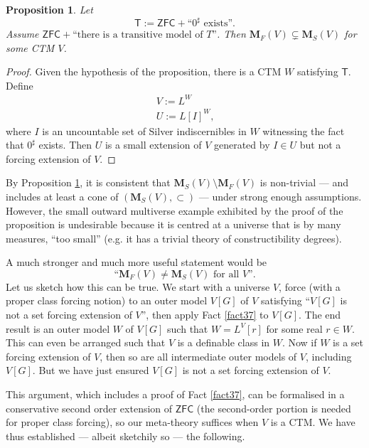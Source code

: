 \documentclass[12pt, twoside]{memoir}
\numberwithin{equation}{section}
\newtheorem{prop}[thm]{Proposition}
\theoremstyle{definition}
\theoremstyle{remark}
\theoremstyle{definition}
\theoremstyle{definition}
\theoremstyle{definition}
\theoremstyle{remark}
\begin{document}
\begin{prop}\label{prop318}
Let 
\begin{equation*}
    \mathsf{T} := \mathsf{ZFC} + \text{``}0^{\sharp}\text{ exists''.}
\end{equation*} 
Assume $\mathsf{ZFC} + \text{``there is a transitive model of } T \text{''}$. Then $\mathbf{M}_F(V) \subsetneq \mathbf{M}_S(V)$ for some CTM $V$.
\end{prop}

\begin{proof}
Given the hypothesis of the proposition, there is a CTM $W$ satisfying $\mathsf{T}$. Define 
\begin{gather*}
    V := L^W \\
    U := L[I]^W \text{,}
\end{gather*}
where $I$ is an uncountable set of Silver indiscernibles in $W$ witnessing the fact that $0^{\sharp}$ exists. Then $U$ is a small extension of $V$ generated by $I \in U$ but not a forcing extension of $V$.
\end{proof}

By Proposition \ref{prop318}, it is consistent that $\mathbf{M}_S(V) \setminus \mathbf{M}_F(V)$ is non-trivial --- and includes at least a cone of $(\mathbf{M}_S(V), \subset)$ --- under strong enough assumptions. However, the small outward multiverse example exhibited by the proof of the proposition is undesirable because it is centred at a universe that is by many measures, ``too small'' (e.g. it has a trivial theory of constructibility degrees). 

A much stronger and much more useful statement would be
\begin{equation}\label{eq31p}
    \text{``} \mathbf{M}_F(V) \neq \mathbf{M}_S(V) \text{ for all } V \text{''.}
\end{equation}
Let us sketch how this can be true. We start with a universe $V$, force (with a proper class forcing notion) to an outer model $V[G]$ of $V$ satisfying ``$V[G]$ is not a set forcing extension of $V$'', then apply Fact \ref{fact37} to $V[G]$. The end result is an outer model $W$ of $V[G]$ such that $W = L^V[r]$ for some real $r \in W$. This can even be arranged such that $V$ is a definable class in $W$. Now if $W$ is a set forcing extension of $V$, then so are all intermediate outer models of $V$, including $V[G]$. But we have just ensured $V[G]$ is not a set forcing extension of $V$. 

This argument, which includes a proof of Fact \ref{fact37}, can be formalised in a conservative second order extension of $\mathsf{ZFC}$ (the second-order portion is needed for proper class forcing), so our meta-theory suffices when $V$ is a CTM. We have thus established --- albeit sketchily so --- the following.
\end{document}
